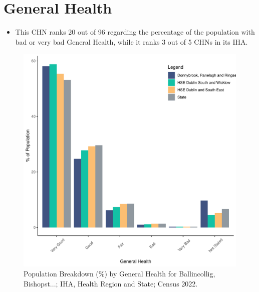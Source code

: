\documentclass{article}
\begin{document}
\pagebreak

\section{General Health}\label{sect:GenHealth}
\begin{itemize}
\item  This CHN ranks  20 out of 96 regarding the percentage of the population with bad or very bad General Health, while it ranks   3 out of 5 CHNs in its IHA.
\end{itemize}
\begin{figure}[h]
	\centering
	\includegraphics[width = 150mm]{../figures/GenED.pdf}
	\caption{Population Breakdown (\%) by General Health for Ballincollig, Bishopst...; IHA, Health Region and State;  Census 2022.}
	\label{fig:2ae19629-1a6a-13a3-e055-000000000001}
	\end{figure}
\end{document}
